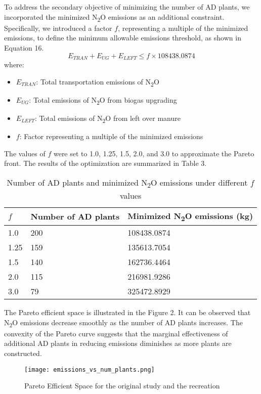 \documentclass[12pt]{article}
\begin{document}
To address the secondary objective of minimizing the number of AD plants, we incorporated the minimized N\textsubscript{2}O emissions as an additional constraint. Specifically, we introduced a factor 
$f$, representing a multiple of the minimized emissions, to define the minimum allowable emissions threshold, as shown in Equation 16.
\begin{equation}
  E_{TRAN} + E_{UG} + E_{LEFT} \leq f \times 108438.0874
\end{equation}
where:
\begin{itemize}
  \item $E_{TRAN}$: Total transportation emissions of N\textsubscript{2}O
  \item $E_{UG}$: Total emissions of N\textsubscript{2}O from biogas upgrading
  \item $E_{LEFT}$: Total emissions of N\textsubscript{2}O from left over manure
  \item $f$: Factor representing a multiple of the minimized emissions
\end{itemize}
The values of $f$ were set to 1.0, 1.25, 1.5, 2.0, and 3.0 to approximate the Pareto front. The results of the optimization are summarized in Table 3.
\begin{table}[h]
  \centering
  \begin{tabular}{|p{1.5cm} | p{5cm} | p{6cm}|}
  \hline
  \rowcolor{gray!30}
  $f$ & Number of AD plants & Minimized N\textsubscript{2}O emissions (kg) \\ \hline
  1.0 & 200 & 108438.0874 \\ \hline
  1.25 & 159 & 135613.7054 \\ \hline
  1.5 & 140 & 162736.4464 \\ \hline
  2.0 & 115 & 216981.9286 \\ \hline
  3.0 & 79 & 325472.8929 \\ \hline
  \end{tabular}
  \caption{Number of AD plants and minimized N\textsubscript{2}O emissions under different $f$ values}
  \label{tab:adplants_emissions}
\end{table}

The Pareto efficient space is illustrated in the Figure 2. It can be observed that N\textsubscript{2}O emissions decrease smoothly as the number of AD plants increases. The convexity of the Pareto curve suggests that the marginal effectiveness of additional AD plants in reducing emissions diminishes as more plants are constructed.

\begin{figure}[H]
  \centering
  \texttt{[image: emissions\_vs\_num\_plants.png]}
  \caption{Pareto Efficient Space for the original study and the recreation}
  \label{fig:pareto_curve}
\end{figure}
\end{document}
